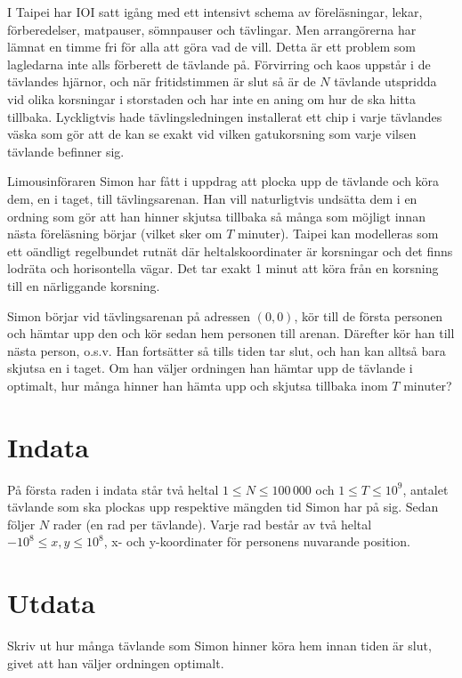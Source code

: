 
I Taipei har IOI satt igång med ett intensivt schema av föreläsningar, lekar, förberedelser, matpauser, sömnpauser och tävlingar. Men arrangörerna har lämnat en timme fri för alla att göra vad de vill. Detta är ett problem som lagledarna inte alls förberett de tävlande på. Förvirring och kaos uppstår i de tävlandes hjärnor, och när fritidstimmen är slut så är de $N$ tävlande utspridda vid olika korsningar i storstaden och har inte en aning om hur de ska hitta tillbaka. Lyckligtvis hade tävlingsledningen installerat ett chip i varje tävlandes väska som gör att de kan se exakt vid vilken gatukorsning som varje vilsen tävlande befinner sig.

Limousinföraren Simon har fått i uppdrag att plocka upp de tävlande och köra dem, en i taget, till tävlingsarenan. Han vill naturligtvis undsätta dem i en ordning som gör att han hinner skjutsa tillbaka så många som möjligt innan nästa föreläsning börjar (vilket sker om $T$ minuter). Taipei kan modelleras som ett oändligt regelbundet rutnät där heltalskoordinater är korsningar och det finns lodräta och horisontella vägar. Det tar exakt 1 minut att köra från en korsning till en närliggande korsning. 

Simon börjar vid tävlingsarenan på adressen $(0, 0)$, kör till de första personen och hämtar upp den och kör sedan hem personen till arenan. Därefter kör han till nästa person, o.s.v. Han fortsätter så tills tiden tar slut, och han kan alltså bara skjutsa en i taget. Om han väljer ordningen han hämtar upp de tävlande i optimalt, hur många hinner han hämta upp och skjutsa tillbaka inom $T$ minuter?

\section*{Indata}
På första raden i indata står två heltal $1 \leq N \leq 100\,000$ och $1 \leq T \leq 10^9$, antalet tävlande som ska plockas upp respektive mängden tid Simon har på sig. Sedan följer $N$ rader (en rad per tävlande). Varje rad består av två heltal $-10^8 \leq x, y \leq 10^8$, x- och y-koordinater för personens nuvarande position.

\section*{Utdata}
Skriv ut hur många tävlande som Simon hinner köra hem innan tiden är slut, givet att han väljer ordningen optimalt.

